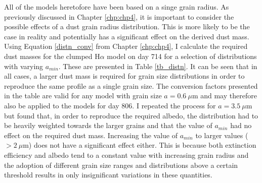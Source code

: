 All of the models heretofore have been based on a singe grain radius.  As previously discussed in Chapter \ref{chp:chp4}, it is important to consider the possible effects of a dust grain radius distribution.  This is more likely to be the case in reality and potentially has a significant effect on the derived dust mass.  Using Equation \ref{distn_conv} from Chapter \ref{chp:chp4}, I calculate the required dust masses for the clumped H$\alpha$ model on 
day 714 for a selection of distributions with varying $a_{min}$.  These 
are presented in Table \ref{tb_distn}.  It can be seen that in all cases, 
a larger dust mass is required for grain size distributions in order to reproduce the same profile as a 
single grain size.  The conversion factors presented in the table are 
valid for any model with grain size $a=0.6~\mu$m and may therefore also be 
applied to the models for day 806.  I repeated the process for 
$a=3.5~\mu$m but found that, in order to reproduce the required albedo, the 
distribution had to be heavily weighted towards the larger grains and that 
the value of $a_{min}$ had no effect on the required dust mass.  
Increasing the value of $a_{min}$ to larger values ($>2~\mu$m) does not 
have a significant effect either.  This is because both extinction 
efficiency and albedo tend to a constant value with increasing grain 
radius and the adoption of different grain size ranges and distributions 
above a certain threshold results in only insignificant variations in 
these quantities.
\setlength{\tabcolsep}{12pt}
